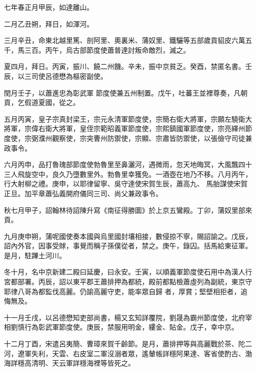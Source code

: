 
\begin{pinyinscope}

 七年春正月甲辰，如達離山。



 二月乙丑朔，拜日，如渾河。



 三月辛丑，命東北越里篤、剖阿里、奧裏米、蒲奴里、鐵驪等五部歲貢貂皮六萬五千，馬三百。丙午，烏古部節度使蕭普達討叛命敵烈，滅之。



 夏四月，拜日。丙寅，振川、饒二州饑。辛未，振中京貧乏。癸酉，禁匿名書。壬辰，以三司使呂德懋為樞密副使。



 閏月壬子，以蕭進忠為彰武軍
 節度使兼五州制置。戊午，吐蕃王並裡尊奏，凡朝貢，乞假道夏國，從之。



 五月丙寅，皇子宗真封梁王，宗元永清軍節度使，宗簡右衛大將軍，宗願左驍衛大將軍，宗偉右衛大將軍，皇侄宗範昭義軍節度使，宗熙鎮國軍節度使，宗亮繹州節度使，宗弼濮州觀察使，宗突曹州防禦使，宗顯、宗肅皆防禦使，以張儉守司徒兼政事令。



 六月丙申，品打魯瑰部節度使勃魯里至鼻灑河，遇微雨，忽天地晦冥，大風飄四十三人飛旋空中，良久乃墮數里外。勃魯里幸獲免。一酒壺在地乃不移。八月丙午，行大射柳之禮。庚申，以耶律留寧、吳守達使宋賀生辰，蕭高九、
 馬胎謀使宋賀正旦。加平章蕭弘義開府儀同三司、尚父兼政事令。



 秋七月甲子，詔翰林待詔陳升寫《南征得勝圖》於上京五鸞殿。丁卯，蒲奴里部來貢。



 九月庚申朔，蒲呢國使奏本國與烏里國封壤相接，數侵掠不寧，賜詔諭之。戊辰，詔內外官，因事受賕，事覺而稱子孫僕從者，禁之。庚午，錄囚。括馬給東征軍。是月，駐蹕土河川。



 冬十月，名中京新建二殿曰延慶，曰永安。壬寅，以順義軍節度使石用中為漢人行宮都部署。丙辰，詔以東平郡王蕭排押為都統，殿前都點檢蕭虛列為副統，東京守耶律八哥為都監伐高麗。仍諭高麗守吏，能率眾自歸
 者，厚賞；堅壁相拒者，追悔無及。



 十一月壬戌，以呂德懋知吏部尚書，楊又玄知詳覆院，劉晟為霸州節度使，北府宰相劉慎行為彰武軍節度使。庚辰，禁服用明金，縷金、貼金。戊子，幸中京。



 十二月丁酉，宋遣呂夷簡、曹璋來賀千齡節。是月，蕭排押等與高麗戰於茶、陀二河，遼軍失利，天雲、右皮室二軍沒溺者眾，遙輦帳詳穩阿果達、客省使酌古、渤海詳穩高清明、天云軍詳穩海裡等皆死之。




\end{pinyinscope}
